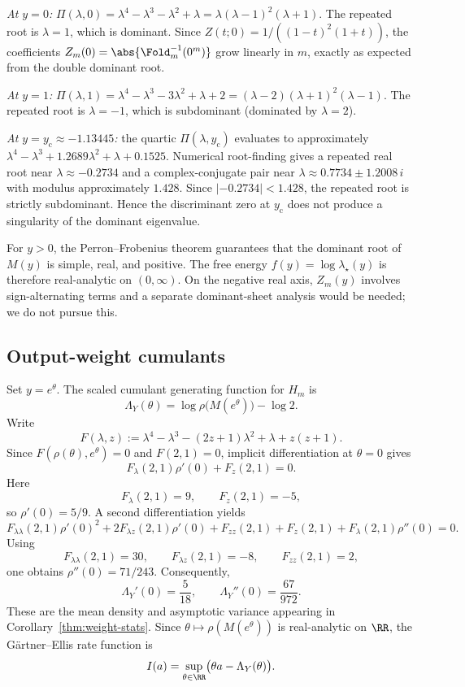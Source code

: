 \emph{At \(y=0\):} \(\Pi(\lambda,0)=\lambda^4-\lambda^3-\lambda^2+\lambda=\lambda(\lambda-1)^2(\lambda+1)\). The repeated root is \(\lambda=1\), which is dominant. Since \(Z(t;0)=1/((1-t)^2(1+t))\), the coefficients \(Z_m(0)=\abs{\Fold_m^{-1}(0^m)}\) grow linearly in \(m\), exactly as expected from the double dominant root.

\emph{At \(y=1\):} \(\Pi(\lambda,1)=\lambda^4-\lambda^3-3\lambda^2+\lambda+2=(\lambda-2)(\lambda+1)^2(\lambda-1)\). The repeated root is \(\lambda=-1\), which is subdominant (dominated by \(\lambda=2\)).

\emph{At \(y=y_{\mathrm{c}}\approx -1.13445\):} the quartic \(\Pi(\lambda,y_{\mathrm{c}})\) evaluates to approximately \(\lambda^4-\lambda^3+1.2689\lambda^2+\lambda+0.1525\). Numerical root-finding gives a repeated real root near \(\lambda\approx -0.2734\) and a complex-conjugate pair near \(\lambda\approx 0.7734\pm 1.2008\,i\) with modulus approximately \(1.428\). Since \(|-0.2734|<1.428\), the repeated root is strictly subdominant. Hence the discriminant zero at \(y_{\mathrm{c}}\) does not produce a singularity of the dominant eigenvalue.

\begin{remark}
For \(y>0\), the Perron--Frobenius theorem guarantees that the dominant root of \(M(y)\) is simple, real, and positive. The free energy \(f(y)=\log\lambda_\star(y)\) is therefore real-analytic on \((0,\infty)\). On the negative real axis, \(Z_m(y)\) involves sign-alternating terms and a separate dominant-sheet analysis would be needed; we do not pursue this.
\end{remark}

\subsection{Output-weight cumulants}
Set \(y=e^\theta\). The scaled cumulant generating function for \(H_m\) is
\[
\Lambda_Y(\theta)
=
\log \rho\!\bigl(M(e^\theta)\bigr)-\log 2.
\]
Write
\[
F(\lambda,z):=\lambda^4-\lambda^3-(2z+1)\lambda^2+\lambda+z(z+1).
\]
Since \(F(\rho(\theta),e^\theta)=0\) and \(F(2,1)=0\), implicit differentiation at \(\theta=0\) gives
\[
F_\lambda(2,1)\rho'(0)+F_z(2,1)=0.
\]
Here
\[
F_\lambda(2,1)=9,\qquad F_z(2,1)=-5,
\]
so \(\rho'(0)=5/9\). A second differentiation yields
\[
F_{\lambda\lambda}(2,1)\rho'(0)^2+2F_{\lambda z}(2,1)\rho'(0)+F_{zz}(2,1)+F_z(2,1)+F_\lambda(2,1)\rho''(0)=0.
\]
Using
\[
F_{\lambda\lambda}(2,1)=30,\qquad
F_{\lambda z}(2,1)=-8,\qquad
F_{zz}(2,1)=2,
\]
one obtains \(\rho''(0)=71/243\). Consequently,
\[
\Lambda_Y'(0)=\frac{5}{18},
\qquad
\Lambda_Y''(0)=\frac{67}{972}.
\]
These are the mean density and asymptotic variance appearing in Corollary~\ref{thm:weight-stats}. Since \(\theta\mapsto \rho(M(e^\theta))\) is real-analytic on \(\RR\), the G\"artner--Ellis rate function is
\[
I(a)=\sup_{\theta\in\RR}\bigl(\theta a-\Lambda_Y(\theta)\bigr).
\]
